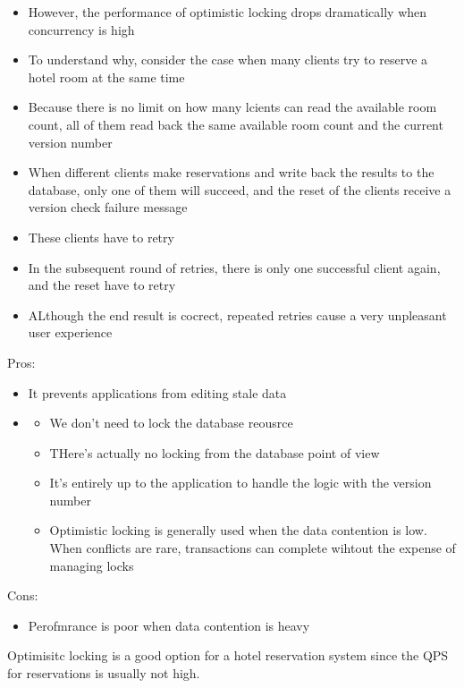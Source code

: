 \documentclass{report}
\theoremstyle{definition}
\begin{document}
\begin{itemize}
\item
However, the performance of optimistic locking drops dramatically when concurrency is high
\item
To understand why, consider the case when many clients try to reserve a hotel room at the same time
\item
Because there is no limit on how many lcients can read the available room count, all of them read back the same available room count and the current version number
\item
When different clients make reservations and write back the results to the database, only one of them will succeed, and the reset of the clients receive a version check failure message
\item
These clients have to retry
\item
In the subsequent round of retries, there is only one successful client again, and the reset have to retry
\item
ALthough the end result is cocrect, repeated retries cause a very unpleasant user experience
\end{itemize}

Pros:

\begin{itemize}
\item
It prevents applications from editing stale data
\item

\begin{itemize}
\item
We don't need to lock the database reousrce
\item
THere's actually no locking from the database point of view
\item
It's entirely up to the application to handle the logic with the version number
\item
Optimistic locking is generally used when the data contention is low. When conflicts are rare, transactions can complete wihtout the expense of managing locks
\end{itemize}
\end{itemize}

Cons:

\begin{itemize}
\item
Perofmrance is poor when data contention is heavy
\end{itemize}

Optimisitc locking is a good option for a hotel reservation system since the QPS for reservations is usually not high.
\end{document}
